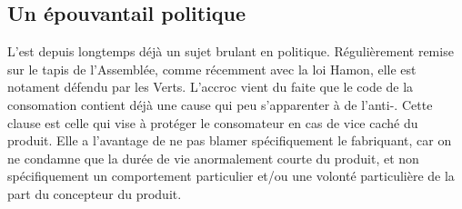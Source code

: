 \subsection{Un épouvantail politique}
L'\op est depuis longtemps déjà un sujet brulant en politique. Régulièrement remise sur le tapis de l'Assemblée, comme récemment avec la loi Hamon, elle est notament défendu par les Verts.
\smallbreak L'accroc vient du faite que le code de la consomation contient déjà une cause qui peu s'apparenter à de l'anti-\op.
Cette clause est celle qui vise à protéger le consomateur en cas de vice caché du produit. Elle a l'avantage de ne pas blamer spécifiquement le fabriquant, car on ne condamne que la durée de vie anormalement courte du produit, et non spécifiquement un comportement particulier et/ou une volonté particulière de la part du concepteur du produit.


